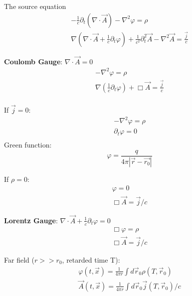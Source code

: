 The source equation
\begin{equation*}
    \begin{gathered}
	-\frac{1}{c}\partial_t(\nabla\cdot\vec{A}) - \nabla^2\varphi = \rho    \\
	\nabla(\nabla\cdot\vec{A} + \frac{1}{c}\partial_t\varphi) + \frac{1}{c^2}\partial^2_t\vec{A} - \nabla^2\vec{A} = \frac{\vec{j}}{c}
    \end{gathered}
\end{equation*}

\textbf{Coulomb Gauge}:	$\nabla\cdot\vec{A} = 0$
\begin{equation*}
    \begin{gathered}
	-\nabla^2\varphi = \rho	\\
	\nabla(\frac{1}{c}\partial_t\varphi) + \Box\vec{A} = \frac{\vec{j}}{c}	\\
    \end{gathered}
\end{equation*}

\indent If $\vec{j} = 0$: 
\begin{equation*}
    \begin{gathered}
	-\nabla^2\varphi = \rho	\\
	\partial_t\varphi = 0	\\
    \end{gathered}
\end{equation*}
Green function:
\begin{equation*}
    \varphi = \frac{q}{4\pi|\vec{r} - \vec{r_0}|}
\end{equation*}

\indent If $\rho = 0$:    
\begin{equation*}
    \begin{gathered}
	\varphi = 0 \\
	\Box\vec{A} = {\vec{j}}/{c}
    \end{gathered}
\end{equation*}

\textbf{Lorentz Gauge}:	$\nabla\cdot\vec{A} + \frac{1}{c}\partial_t\varphi = 0$
\begin{equation*}
    \begin{gathered}
	\Box\varphi = \rho	\\
	\Box\vec{A} = {\vec{j}}/{c}
    \end{gathered}
\end{equation*}

Far field ($r >> r_0$, retarded time T):
\begin{equation*}
    \begin{gathered}
	\varphi(t,\vec{x}) = \frac{1}{4\pi r}\int d\vec{r}_0\rho(T, \vec{r}_0)    \\
	\vec{A}(t, \vec{x}) = \frac{1}{4\pi r}\int d\vec{r}_0\vec{j}(T,\vec{r}_0)/c    \\
    \end{gathered}
\end{equation*}

